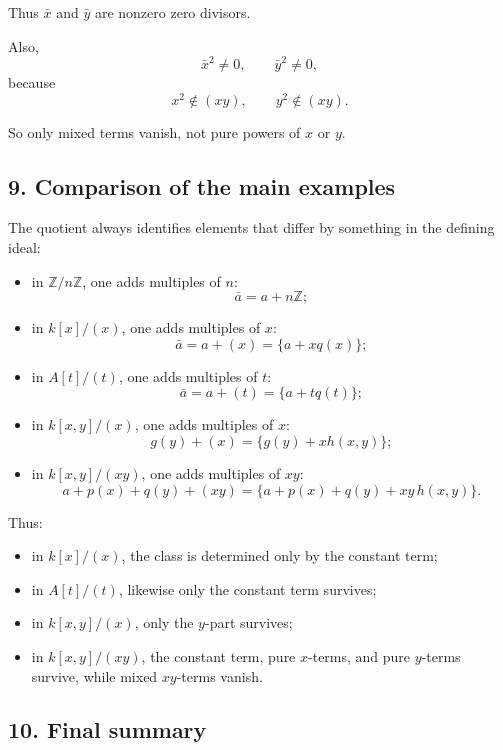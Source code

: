 \documentclass[12pt,a4paper,oneside]{report}
\theoremstyle{notespace}
\begin{document}
	Thus \(\bar x\) and \(\bar y\) are nonzero zero divisors.
	
	Also,
	\[
	\bar x^2\neq 0,\qquad \bar y^2\neq 0,
	\]
	because
	\[
	x^2\notin (xy),\qquad y^2\notin (xy).
	\]
	
	So only mixed terms vanish, not pure powers of \(x\) or \(y\).
	
	\subsection{9. Comparison of the main examples}
	
	The quotient always identifies elements that differ by something in the defining ideal:
	
	\begin{itemize}
		\item in \(\mathbb Z/n\mathbb Z\), one adds multiples of \(n\):
		\[
		\bar a=a+n\mathbb Z;
		\]
		
		\item in \(k[x]/(x)\), one adds multiples of \(x\):
		\[
		\bar a=a+(x)=\{a+xq(x)\};
		\]
		
		\item in \(A[t]/(t)\), one adds multiples of \(t\):
		\[
		\bar a=a+(t)=\{a+tq(t)\};
		\]
		
		\item in \(k[x,y]/(x)\), one adds multiples of \(x\):
		\[
		g(y)+(x)=\{g(y)+xh(x,y)\};
		\]
		
		\item in \(k[x,y]/(xy)\), one adds multiples of \(xy\):
		\[
		a+p(x)+q(y)+(xy)=\{a+p(x)+q(y)+xy\,h(x,y)\}.
		\]
	\end{itemize}
	
	Thus:
	
	\begin{itemize}
		\item in \(k[x]/(x)\), the class is determined only by the constant term;
		\item in \(A[t]/(t)\), likewise only the constant term survives;
		\item in \(k[x,y]/(x)\), only the \(y\)-part survives;
		\item in \(k[x,y]/(xy)\), the constant term, pure \(x\)-terms, and pure \(y\)-terms survive, while mixed \(xy\)-terms vanish.
	\end{itemize}
	
	\subsection{10. Final summary}
	
\end{document}
